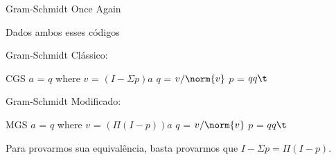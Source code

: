 \begin{frame}[fragile]{Gram-Schmidt Once Again}
  \begin{center}
    Dados ambos esses códigos
  \end{center}

  \begin{minipage}[t]{0.45\textwidth}
    Gram-Schmidt Clássico:
    \vspace{0.2cm}
    \begin{code}
CGS $a$ = $q$
    where
        $v$ = $(I - \Sigma p) a$
        $q$ = $v / \norm{v}$
        $p$ = $qq\t$
    \end{code}
  \end{minipage}
  \hfill
  \vrule
  \hfill
  \begin{minipage}[t]{0.50\textwidth}
    Gram-Schmidt Modificado:
    \vspace{0.2cm}
    \begin{code}
MGS $a$ = $q$
    where
        $v$ = $(\Pi (I - p)) a$
        $q$ = $v / \norm{v}$
        $p$ = $qq\t$
    \end{code}
  \end{minipage}
  \vfill
  \pause
  \begin{center}
    Para provarmos sua equivalência, basta provarmos que $I - \Sigma p = \Pi (I - p)$.
  \end{center}
\end{frame}
